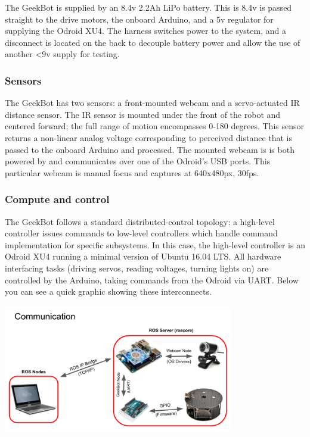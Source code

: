 The GeekBot is supplied by an 8.4v 2.2Ah LiPo battery. This is 8.4v is
passed straight to the drive motors, the onboard Arduino, and a 5v
regulator for supplying the Odroid XU4. The harness switches power to
the system, and a disconnect is located on the back to decouple battery
power and allow the use of another \textless9v supply for testing.

\hypertarget{sensors}{%
\subsubsection{Sensors}\label{sensors}}

The GeekBot has two sensors: a front-mounted webcam and a servo-actuated
IR distance sensor. The IR sensor is mounted under the front of the
robot and centered forward; the full range of motion encompasses 0-180
degrees. This sensor returns a non-linear analog voltage corresponding
to perceived distance that is passed to the onboard Arduino and
processed. The mounted webcam is is both powered by and communicates
over one of the Odroid's USB ports. This particular webcam is manual
focus and captures at 640x480px, 30fps.

\hypertarget{compute-and-control}{%
\subsubsection{Compute and control}\label{compute-and-control}}

The GeekBot follows a standard distributed-control topology: a
high-level controller issues commands to low-level controllers which
handle command implementation for specific subsystems. In this case, the
high-level controller is an Odroid XU4 running a minimal version of
Ubuntu 16.04 LTS. All hardware interfacing tasks (driving servos,
reading voltages, turning lights on) are controlled by the Arduino,
taking commands from the Odroid via UART. Below you can see a quick
graphic showing these interconnects.

\includegraphics[width=0.75\textwidth,height=\textheight]{figures/geekbot/graphics/comm_graphic.png}

